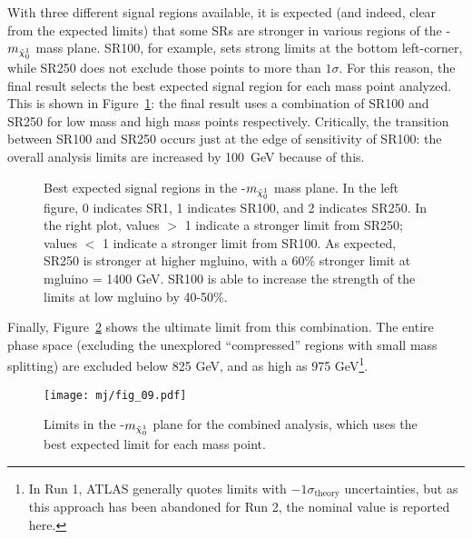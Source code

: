 With three different signal regions available, it is expected (and indeed, clear from the expected limits) that some SRs are stronger in various regions of the \mgluino-$m_{\tilde{\chi}_0^1}$ mass plane. SR100, for example, sets strong limits at the bottom left-corner, while SR250 does not exclude those points to more than $1 \sigma$. For this reason, the final result selects the best expected signal region for each mass point analyzed. This is shown in Figure~\ref{fig:search:limits:optimal}: the final result uses a combination of SR100 and SR250 for low mass and high mass points respectively. Critically, the transition between SR100 and SR250 occurs just at the edge of sensitivity of SR100: the overall analysis limits are increased by 100~GeV because of this.


\begin{figure}[!ht]
  \centering
  
    
  \caption{Best expected signal regions in the \mgluino-$m_{\tilde{\chi}_0^1}$ mass plane. In the left figure, 0 indicates SR1, 1 indicates SR100, and 2 indicates SR250. In the right plot, values $>$ 1 indicate a stronger limit from SR250; values $<$ 1 indicate a stronger limit from SR100. As expected, SR250 is stronger at higher mgluino, with a 60\% stronger limit at mgluino = 1400 GeV. SR100 is able to increase the strength of the limits at low mgluino by 40-50\%. } 
               
  \label{fig:search:limits:optimal}
\end{figure}


Finally, Figure~\ref{fig:search:limits:combined} shows the ultimate limit from this combination. The entire phase space (excluding the unexplored ``compressed'' regions with small mass splitting) are excluded below 825 GeV, and as high as 975 GeV\footnote{In Run 1, ATLAS generally quotes limits with $-1\sigma_\mathrm{theory}$ uncertainties, but as this approach has been abandoned for Run 2, the nominal value is reported here.}. 


\begin{figure}
\centering
\texttt{[image: mj/fig\_09.pdf]}
\caption{Limits in the \mgluino-$m_{\tilde{\chi}_0^1}$ plane for the combined analysis, which uses the best expected limit for each mass point.}
\label{fig:search:limits:combined}
\end{figure}

